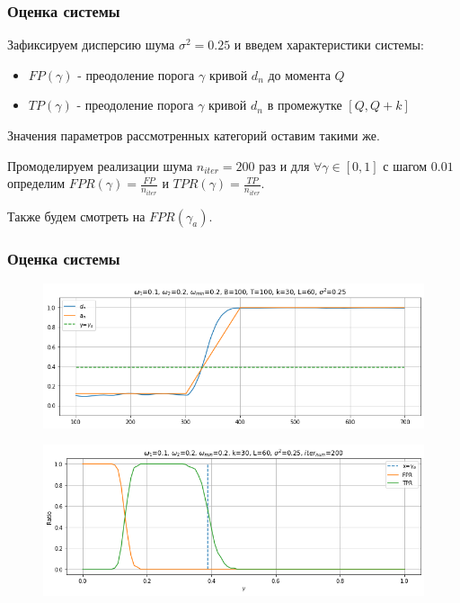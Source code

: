 \documentclass[11pt]{beamer}
\begin{document}
	
	
	\begin{frame}
		\frametitle{Оценка системы}
		Зафиксируем дисперсию шума $ \sigma^2 = 0.25 $ и введем характеристики системы:
		
		\begin{itemize}
			\item $ FP(\gamma) $ - преодоление порога $ \gamma $ кривой $ d_n $ до момента $ Q $
			\item $ TP(\gamma) $ - преодоление порога $ \gamma $ кривой $ d_n $ в промежутке $ [Q, Q+k] $
		\end{itemize}
		
		Значения параметров рассмотренных категорий оставим такими же. 
		
		\bigskip
		
		Промоделируем реализации шума $ n_{iter} = 200 $ раз и для $ \forall \gamma \in [0, 1] $ с шагом $ 0.01 $ определим $ FPR(\gamma) = \frac{FP}{n_{iter}} $ и $ TPR(\gamma) = \frac{TP}{n_{iter}} $.
		
		Также будем смотреть на $ FPR(\gamma_a) $.
		
	\end{frame}
	
	\begin{frame}
		\frametitle{Оценка системы}
		\begin{figure}[b]
			\centering
			\includegraphics[width=0.85\linewidth]{imgs/system_estimation_one_iter.png}
		\end{figure}
		
		\begin{figure}[b]
			\centering
			\includegraphics[width=0.85\linewidth]{imgs/system_estimation.png}
		\end{figure}
		
	\end{frame}
	
\end{document}
